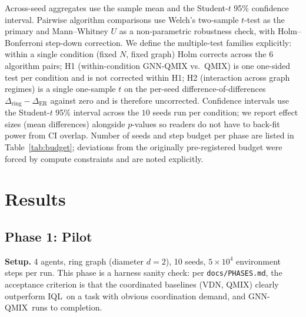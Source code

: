\documentclass[manuscript, screen, review]{jair}
\newcommand{\algoname}[1]{\textsc{#1}}
\newcommand{\iql}{\algoname{IQL}}
\newcommand{\vdn}{\algoname{VDN}}
\newcommand{\qmix}{\algoname{QMIX}}
\newcommand{\gnnqmix}{\algoname{GNN-QMIX}}
\begin{document}
Across-seed aggregates use the sample mean and the Student-$t$ 95\%
confidence interval. Pairwise algorithm comparisons use Welch's two-sample
$t$-test as the primary and Mann--Whitney $U$ as a non-parametric
robustness check, with Holm--Bonferroni step-down correction. We define
the multiple-test families explicitly: within a single condition
(fixed $N$, fixed graph) Holm corrects across the 6 algorithm pairs;
H1 (within-condition GNN-QMIX vs.\ QMIX) is one one-sided test per
condition and is not corrected within H1; H2 (interaction across
graph regimes) is a single one-sample $t$ on the per-seed
difference-of-differences $\Delta_{\text{ring}} - \Delta_{\text{ER}}$
against zero and is therefore uncorrected. Confidence intervals use the
Student-$t$ 95\% interval across the $10$ seeds run per condition; we report
effect sizes (mean differences) alongside $p$-values so readers do not have to
back-fit power from CI overlap. Number of seeds
and step budget per phase are listed in Table~\ref{tab:budget};
deviations from the originally pre-registered budget were forced by
compute constraints and are noted explicitly.

\section{Results}
\label{sec:results}

\subsection{Phase 1: Pilot}
\label{sec:results:pilot}

\textbf{Setup.} 4 agents, ring graph (diameter $d=2$), 10 seeds, $5 \times 10^4$
environment steps per run. This phase is a harness sanity check: per
\texttt{docs/PHASES.md}, the acceptance criterion is that the coordinated
baselines (\vdn, \qmix) clearly outperform \iql\ on a task with obvious
coordination demand, and \gnnqmix\ runs to completion.
\end{document}
